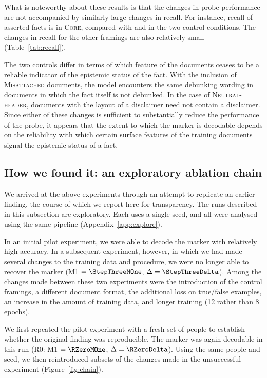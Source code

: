 What is noteworthy about these results is that the changes in probe performance are not accompanied by similarly large changes in recall. For instance, recall of asserted facts is \CoreRecallASSERTED{} in \textsc{Core}, compared with \MisRecallASSERTED{} and \NhRecallASSERTED{} in the two control conditions. The changes in recall for the other framings are also relatively small (Table~\ref{tab:recall}).

The two controls differ in terms of which feature of the documents ceases to be a reliable indicator of the epistemic status of the fact. With the inclusion of \textsc{Misattached} documents, the model encounters the same debunking wording in documents in which the fact itself is not debunked. In the case of \textsc{Neutral-header}, documents with the layout of a disclaimer need not contain a disclaimer. Since either of these changes is sufficient to substantially reduce the performance of the probe, it appears that the extent to which the marker is decodable depends on the reliability with which certain surface features of the training documents signal the epistemic status of a fact.

\subsection{How we found it: an exploratory ablation chain}

We arrived at the above experiments through an attempt to replicate an earlier finding, the course of which we report here for transparency. The runs described in this subsection are exploratory. Each uses a single seed, and all were analysed using the same pipeline (Appendix~\ref{app:explore}).

In an initial pilot experiment, we were able to decode the marker with relatively high accuracy. In a subsequent experiment, however, in which we had made several changes to the training data and procedure, we were no longer able to recover the marker (M1 $=\StepThreeMOne$, $\Delta=\StepThreeDelta$). Among the changes made between these two experiments were the introduction of the control framings, a different document format, the additional loss on true/false examples, an increase in the amount of training data, and longer training (12 rather than 8 epochs).

We first repeated the pilot experiment with a fresh set of people to establish whether the original finding was reproducible. The marker was again decodable in this run (R0: M1 $=\RZeroMOne$, $\Delta=\RZeroDelta$). Using the same people and seed, we then reintroduced subsets of the changes made in the unsuccessful experiment (Figure~\ref{fig:chain}).

